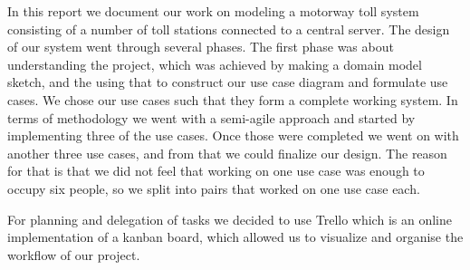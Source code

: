 
In this report we document our work on modeling a motorway toll system consisting of a number of toll stations connected to a central server. The design of our system went through several phases. The first phase was about understanding the project, which was achieved by making a domain model sketch, and the using that to construct our use case diagram and formulate use cases. We chose our use cases such that they form a complete working system. In terms of methodology we went with a semi-agile approach and started by implementing three of the use cases. Once those were completed we went on with another three use cases, and from that we could finalize our design. The reason for that is that we did not feel that working on one use case was enough to occupy six people, so we split into pairs that worked on one use case each.

For planning and delegation of tasks we decided to use Trello which is an online implementation of a kanban board, which allowed us to visualize and organise the workflow of our project. 